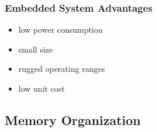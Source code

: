 \documentclass[journal]{IEEEtran}
\begin{document}
{\subsubsection{Embedded System Advantages}
\begin{itemize}
	\item low power consumption
	\item small size
	\item rugged operating ranges
	\item low unit cost
\end{itemize}


\subsection{Memory Organization}

}
\end{document}
